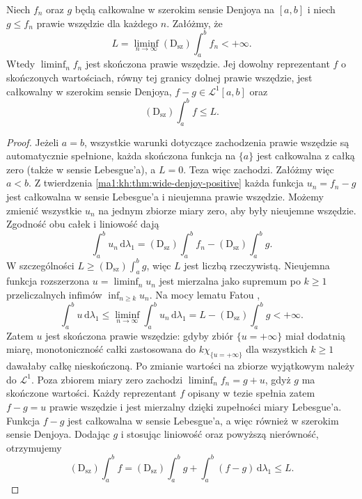 \begin{twierdzenie}
\label{it:thm:wide-denjoy-fatou}
Niech $f_n$ oraz $g$ będą całkowalne w szerokim sensie
Denjoya na $[a,b]$ i niech $g\le f_n$ prawie wszędzie
dla każdego $n$. Załóżmy, że
\[
 L=\liminf_{n\to\infty}(\mathrm D_{\mathrm{sz}})\int_a^b f_n
 <+\infty.
\]
Wtedy $\liminf_n f_n$ jest skończona prawie wszędzie.
Jej dowolny reprezentant $f$ o skończonych wartościach,
równy tej granicy dolnej prawie wszędzie, jest całkowalny
w szerokim sensie Denjoya, $f-g\in\mathcal L^1[a,b]$ oraz
\[
 (\mathrm D_{\mathrm{sz}})\int_a^b f\le L.
\]
\end{twierdzenie}
\begin{proof}
Jeżeli $a=b$, wszystkie warunki dotyczące zachodzenia
prawie wszędzie są automatycznie spełnione, każda
skończona funkcja na $\{a\}$ jest całkowalna z całką
zero (także w sensie Lebesgue'a), a $L=0$. Teza więc
zachodzi. Załóżmy więc $a<b$.
Z twierdzenia \ref{ma1:kh:thm:wide-denjoy-positive} każda
funkcja $u_n=f_n-g$ jest całkowalna w sensie Lebesgue'a
i nieujemna prawie wszędzie. Możemy zmienić wszystkie
$u_n$ na jednym zbiorze miary zero, aby były nieujemne
wszędzie. Zgodność obu całek i liniowość dają
\[
 \int_a^b u_n\,\mathrm d\lambda_1
 =(\mathrm D_{\mathrm{sz}})\int_a^b f_n
  -(\mathrm D_{\mathrm{sz}})\int_a^b g .
\]
W szczególności $L\ge(\mathrm D_{\mathrm{sz}})\int_a^b g$,
więc $L$ jest liczbą rzeczywistą.
Nieujemna funkcja rozszerzona $u=\liminf_n u_n$
jest mierzalna jako supremum po $k\ge1$ przeliczalnych
infimów $\inf_{n\ge k}u_n$. Na mocy lematu Fatou ,
\[
 \int_a^b u\,\mathrm d\lambda_1
 \le \liminf_{n\to\infty}\int_a^b u_n\,\mathrm d\lambda_1
 =L-(\mathrm D_{\mathrm{sz}})\int_a^b g<+\infty.
\]
Zatem $u$ jest skończona prawie wszędzie: gdyby zbiór $\{u=+\infty\}$ miał dodatnią miarę, monotoniczność całki zastosowana do $k\chi_{\{u=+\infty\}}$ dla wszystkich $k\ge1$ dawałaby całkę nieskończoną. Po zmianie
wartości na zbiorze wyjątkowym należy do $\mathcal L^1$.
Poza zbiorem miary zero zachodzi
$\liminf_n f_n=g+u$, gdyż $g$ ma skończone wartości.
Każdy reprezentant $f$ opisany w tezie spełnia zatem
$f-g=u$ prawie wszędzie i jest mierzalny dzięki zupełności
miary Lebesgue'a. Funkcja $f-g$ jest całkowalna w sensie
Lebesgue'a, a więc również w szerokim sensie Denjoya.
Dodając $g$ i stosując liniowość oraz powyższą nierówność,
otrzymujemy
\[
 (\mathrm D_{\mathrm{sz}})\int_a^b f
 =(\mathrm D_{\mathrm{sz}})\int_a^b g
  +\int_a^b (f-g)\,\mathrm d\lambda_1\le L.
\]
\end{proof}

